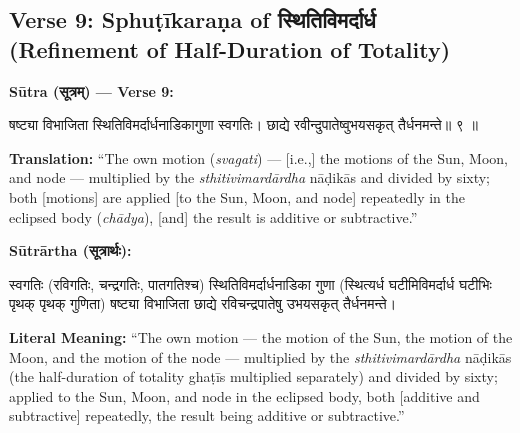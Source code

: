 \documentclass[11pt,a4paper]{article}
\newcommand{\dev}[1]{{\devanagarifont #1}}
\newenvironment{sanskritverse}{%
  \begin{center}\begin{minipage}{0.95\textwidth}
  \setlength{\leftskip}{1em}
  \setlength{\rightskip}{1em}
  \dev
}{\end{minipage}\end{center}}
\newenvironment{paracol}[1]{\begingroup}{\endgroup}
\newcommand{\switchcolumn}[1][]{%
  \ifnum#1=0\relax\else\par\nobreak\vspace{0.5em}\par\nobreak\fi%
}
\begin{document}
\subsection{Verse 9: Sphuṭīkaraṇa of \texorpdfstring{{\devanagarifont स्थितिविमर्दार्ध}}{sthitivimardārdha} (Refinement of Half-Duration of Totality)}

\vspace{0.5em}
\noindent\textbf{Sūtra (\dev{सूत्रम्}) — Verse 9:}

\begin{paracol}{2}

\begin{sanskritverse}
षष्ट्या विभाजिता स्थितिविमर्दार्धनाडिकागुणा स्वगतिः।
छाद्ये रवीन्दुपातेष्वुभयसकृत् तैर्धनमन्ते॥ ९ ॥
\end{sanskritverse}

\switchcolumn

\textbf{Translation:} ``The own motion (\textit{svagati}) --- [i.e.,] the motions of the Sun, Moon, and node --- multiplied by the \textit{sthitivimardārdha} nāḍikās and divided by sixty; both [motions] are applied [to the Sun, Moon, and node] repeatedly in the eclipsed body (\textit{chādya}), [and] the result is additive or subtractive.''

\end{paracol}

\vspace{0.5em}

\begin{paracol}{2}

\noindent\textbf{Sūtrārtha (\dev{सूत्रार्थः}):}
\begin{sanskritverse}
स्वगतिः (रविगतिः, चन्द्रगतिः, पातगतिश्च) स्थितिविमर्दार्धनाडिका गुणा
(स्थित्यर्ध घटीमिविमर्दार्ध घटीभिः पृथक् पृथक् गुणिता) षष्ट्या विभाजिता छाद्ये
रविचन्द्रपातेषु उभयसकृत् तैर्धनमन्ते।
\end{sanskritverse}

\switchcolumn

\textbf{Literal Meaning:} ``The own motion --- the motion of the Sun, the motion of the Moon, and the motion of the node --- multiplied by the \textit{sthitivimardārdha} nāḍikās (the half-duration of totality ghaṭīs multiplied separately) and divided by sixty; applied to the Sun, Moon, and node in the eclipsed body, both [additive and subtractive] repeatedly, the result being additive or subtractive.''

\end{paracol}
\end{document}
